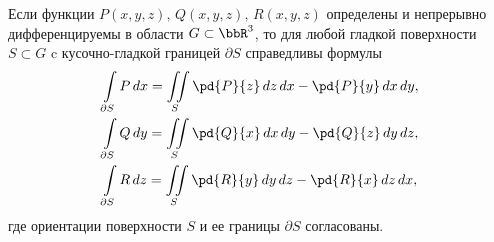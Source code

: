 \begin{thm}
Если функции $P(x,y,z),\, Q(x,y,z),\, R(x,y,z)$ определены и непрерывно дифференцируемы в области $G\subset \bbR^3$, то для любой гладкой поверхности $S\subset G$ c кусочно-гладкой границей $\partial S$ справедливы формулы
\begin{align}\label{yaa14e2}
&\int\limits_{\partial S} P\,dx = \iint\limits_{S} \pd{P}{z}\,dz\,dx-\pd{P}{y}\,dx\,dy,
\\\label{yaa14e3}
&\int\limits_{\partial S} Q\,dy = \iint\limits_{S} \pd{Q}{x}\,dx\,dy- \pd{Q}{z}\,dy\,dz,
\\ \label{yaa14e4}
&\int\limits_{\partial S} R\,dz =\iint\limits_{S} \pd{R}{y}\,dy\,dz- \pd{R}{x}\,dz\,dx,
\end{align}
где ориентации поверхности $S$ и ее границы $\partial S$ согласованы.
\end{thm}
